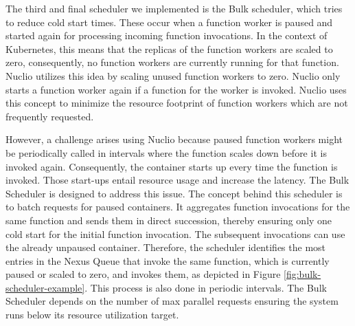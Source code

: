 The third and final scheduler we implemented is the Bulk scheduler, which tries to reduce cold start times. These occur when a function worker is paused and started again for processing incoming function invocations. In the context of Kubernetes, this means that the replicas of the function workers are scaled to zero, consequently, no function workers are currently running for that function. Nuclio utilizes this idea by scaling unused function workers to zero. Nuclio only starts a function worker again if a function for the worker is invoked. Nuclio uses this concept to minimize the resource footprint of function workers which are not frequently requested.

However, a challenge arises using Nuclio because paused function workers might be periodically called in intervals where the function scales down before it is invoked again. Consequently, the container starts up every time the function is invoked. Those start-ups entail resource usage and increase the latency. The Bulk Scheduler is designed to address this issue. The concept behind this scheduler is to batch requests for paused containers. It aggregates function invocations for the same function and sends them in direct succession, thereby ensuring only one cold start for the initial function invocation. The subsequent invocations can use the already unpaused container. Therefore, the scheduler identifies the most entries in the Nexus Queue that invoke the same function, which is currently paused or scaled to zero, and invokes them, as depicted in Figure \ref{fig:bulk-scheduler-example}. This process is also done in periodic intervals. The Bulk Scheduler depends on the number of max parallel requests ensuring the system runs below its resource utilization target.
